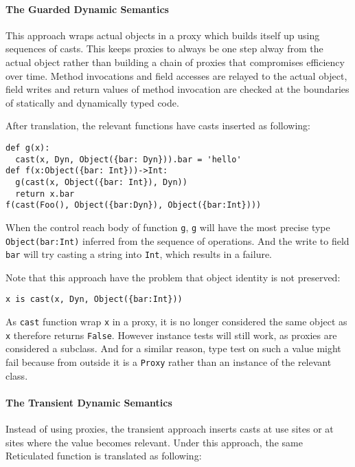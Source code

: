 \paragraph{The Guarded Dynamic Semantics}

This approach wraps actual objects in a proxy which builds itself up using sequences of casts.
This keeps proxies to always be one step alway from the actual object rather than building
a chain of proxies that compromises efficiency over time.
Method invocations and field accesses are relayed to the actual object,
field writes and return values of method invocation are checked at the boundaries
of statically and dynamically typed code.

After translation, the relevant functions have casts inserted as following:

\begin{verbatim}
def g(x):
  cast(x, Dyn, Object({bar: Dyn})).bar = 'hello'
def f(x:Object({bar: Int}))->Int:
  g(cast(x, Object({bar: Int}), Dyn))
  return x.bar
f(cast(Foo(), Object({bar:Dyn}), Object({bar:Int})))
\end{verbatim}

When the control reach body of function \texttt{g},
\texttt{g} will have the most precise type \texttt{Object({bar:Int})} inferred from the sequence
of operations. And the write to field \texttt{bar} will try casting a string into \texttt{Int},
which results in a failure.

Note that this approach have the problem that object identity is not preserved:

\begin{verbatim}
x is cast(x, Dyn, Object({bar:Int}))
\end{verbatim}

As \texttt{cast} function wrap \texttt{x} in a proxy, it is no longer considered the same object as \texttt{x}
therefore returns \texttt{False}. However instance tests will still work, as proxies are considered a subclass.
And for a similar reason, type test on such a value might fail because from outside it is a \texttt{Proxy}
rather than an instance of the relevant class.

\paragraph{The Transient Dynamic Semantics}

Instead of using proxies, the transient approach inserts casts at use sites or at sites where
the value becomes relevant. Under this approach, the same Reticulated function is translated as following:

